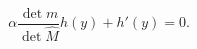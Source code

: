 \begin{equation}
  \label{eq:40}
  \alpha \frac{\det m}{\det \hat{M}} h(y) + h'(y) = 0.
\end{equation}

